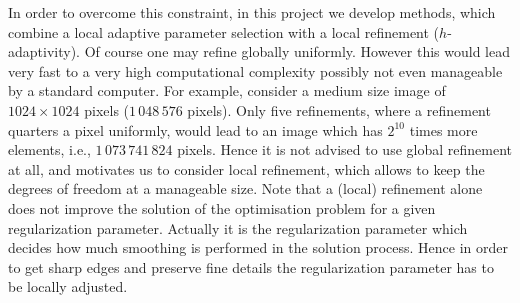 \documentclass[enabledeprecatedfontcommands,cleardoublepage=empty,headsepline,twoside,11pt,DIV=15,BCOR=12mm,final]{scrartcl}
\begin{document}
In order to overcome this constraint, in this project we develop methods, which combine a local adaptive parameter selection with a local refinement ($h$-adaptivity). Of course one may refine globally uniformly. However this would lead very fast to a very high computational complexity possibly not even manageable by a standard computer. For example, consider a medium size image of $1024 \times 1024$ pixels ($1\, 048\, 576$ pixels). Only five refinements, where a refinement quarters a pixel uniformly, would lead to an image which has $2^{10}$ times more elements, i.e., $1\, 073\, 741\, 824$ pixels. Hence it is not advised to use global refinement at all, and motivates us to consider local refinement, which allows to keep the degrees of freedom at a manageable size. Note that a (local) refinement alone does not improve the solution of the optimisation problem for a given regularization parameter. Actually it is the regularization parameter which decides how much smoothing is performed in the solution process. Hence in order to get sharp edges and preserve fine details the regularization parameter has to be locally adjusted. 
\end{document}
